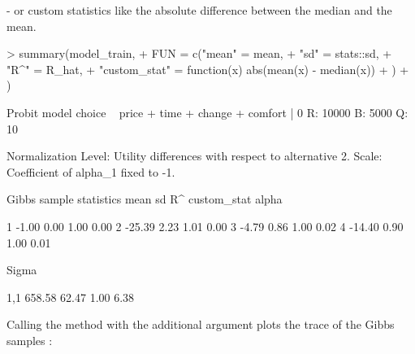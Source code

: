 \documentclass[article]{jss}
\newcommand{\fct}[1]{\code{#1()}}
\begin{document}
- or custom statistics like the absolute difference between the median and the mean.

\begin{Schunk}
\begin{Sinput}
> summary(model_train,
+          FUN = c("mean"        = mean,
+                  "sd"          = stats::sd,
+                  "R^"          = R_hat,
+                  "custom_stat" = function(x) abs(mean(x) - median(x))
+                  )
+         )
\end{Sinput}
\begin{Soutput}
Probit model
choice ~ price + time + change + comfort | 0 
R: 10000 
B: 5000 
Q: 10 

Normalization
Level: Utility differences with respect to alternative 2.
Scale: Coefficient of alpha_1 fixed to -1.

Gibbs sample statistics
               mean           sd           R^  custom_stat
 alpha
                                                          
     1        -1.00         0.00         1.00         0.00
     2       -25.39         2.23         1.01         0.00
     3        -4.79         0.86         1.00         0.02
     4       -14.40         0.90         1.00         0.01

 Sigma
                                                          
   1,1       658.58        62.47         1.00         6.38
\end{Soutput}
\end{Schunk}

Calling the \fct{plot} method with the additional argument  plots the trace of the Gibbs samples :
\end{document}
